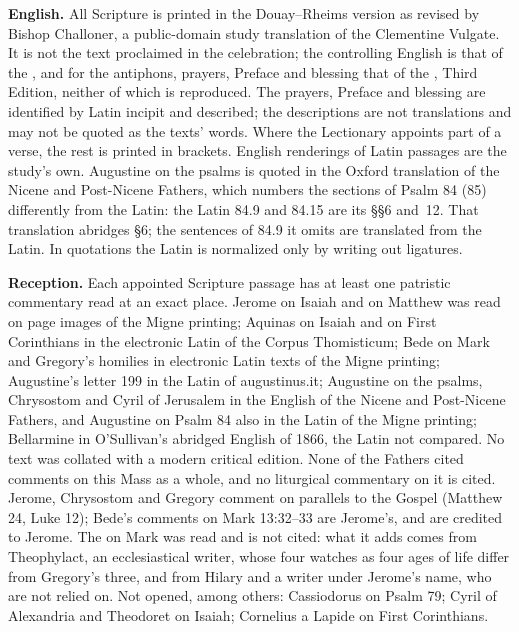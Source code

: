 {\textbf{English.} All Scripture is printed in the Douay--Rheims version as
revised by Bishop Challoner, a public-domain study translation of the
Clementine Vulgate. It is not the text proclaimed in the celebration; the
controlling English is that of the , and for the antiphons, prayers,
Preface and blessing that of the , Third Edition, neither of
which is reproduced. The prayers, Preface and blessing are identified by Latin
incipit and described; the descriptions are not translations and may not be
quoted as the texts' words. Where the Lectionary appoints part of a verse, the
rest is printed in brackets. English renderings of Latin passages are the
study's own. Augustine on the psalms is quoted in the Oxford translation of
the Nicene and Post-Nicene Fathers, which numbers the sections of Psalm 84
(85) differently from the Latin: the Latin 84.9 and 84.15 are its §§6 and~12.
That translation abridges §6; the sentences of 84.9 it omits are translated
from the Latin.
In quotations the Latin is normalized only by writing out ligatures.

\textbf{Reception.} Each appointed Scripture passage has at least one patristic
commentary read at an exact place. Jerome on Isaiah and on Matthew was read on
page images of the Migne printing; Aquinas on Isaiah and on First Corinthians
in the electronic Latin of the Corpus Thomisticum; Bede on Mark and Gregory's
homilies in electronic Latin texts of the Migne printing; Augustine's letter
199 in the Latin of augustinus.it; Augustine on the psalms, Chrysostom and
Cyril of Jerusalem in the English of the Nicene and Post-Nicene Fathers,
and Augustine on Psalm 84 also in the Latin of the Migne printing;
Bellarmine in O'Sullivan's abridged English of 1866, the Latin not compared.
No text was collated with a modern critical edition. None of the Fathers
cited comments on this Mass as a whole, and no liturgical commentary on it is
cited. Jerome,
Chrysostom and Gregory comment on parallels to the Gospel (Matthew 24, Luke
12); Bede's comments on Mark 13:32--33 are Jerome's, and are credited to
Jerome. The  on Mark was read and is not cited: what it
adds comes from Theophylact, an ecclesiastical writer, whose four watches as
four ages of life differ from Gregory's three, and from Hilary and a writer
under Jerome's name, who are not relied on. Not opened, among others:
Cassiodorus on Psalm 79; Cyril of Alexandria and Theodoret on Isaiah;
Cornelius a Lapide on First Corinthians.

}

